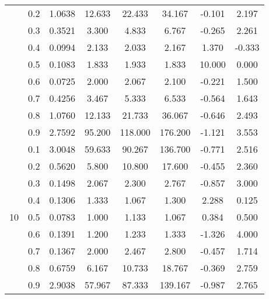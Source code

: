 \documentclass[11pt,a4paper]{report}
\begin{document}
\begin{longtable}{ | c | c || c | c | c | c | c | c | }
 & 0.2 & 1.0638 & 12.633 & 22.433 & 34.167 & -0.101 & 2.197 \\
 & 0.3 & 0.3521 & 3.300 & 4.833 & 6.767 & -0.265 & 2.261 \\
 & 0.4 & 0.0994 & 2.133 & 2.033 & 2.167 & 1.370 & -0.333 \\
 & 0.5 & 0.1083 & 1.833 & 1.933 & 1.833 & 10.000 & 0.000 \\
 & 0.6 & 0.0725 & 2.000 & 2.067 & 2.100 & -0.221 & 1.500 \\
 & 0.7 & 0.4256 & 3.467 & 5.333 & 6.533 & -0.564 & 1.643 \\
 & 0.8 & 1.0760 & 12.133 & 21.733 & 36.067 & -0.646 & 2.493 \\
 & 0.9 & 2.7592 & 95.200 & 118.000 & 176.200 & -1.121 & 3.553 \\
 \hline
\multirow{9}{*}{10} & 0.1 & 3.0048 & 59.633 & 90.267 & 136.700 & -0.771 & 2.516 \\
 & 0.2 & 0.5620 & 5.800 & 10.800 & 17.600 & -0.455 & 2.360 \\
 & 0.3 & 0.1498 & 2.067 & 2.300 & 2.767 & -0.857 & 3.000 \\
 & 0.4 & 0.1306 & 1.333 & 1.067 & 1.300 & 2.288 & 0.125 \\
 & 0.5 & 0.0783 & 1.000 & 1.133 & 1.067 & 0.384 & 0.500 \\
 & 0.6 & 0.1391 & 1.200 & 1.233 & 1.333 & -1.326 & 4.000 \\
 & 0.7 & 0.1367 & 2.000 & 2.467 & 2.800 & -0.457 & 1.714 \\
 & 0.8 & 0.6759 & 6.167 & 10.733 & 18.767 & -0.369 & 2.759 \\
 & 0.9 & 2.9038 & 57.967 & 87.333 & 139.167 & -0.987 & 2.765 \\
 \hline
\hline
\end{longtable}
\end{document}
